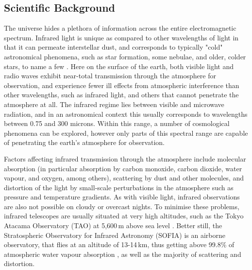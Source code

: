 \subsection{Scientific Background}

The universe hides a plethora of information across the entire electromagnetic spectrum. Infrared light is unique as compared to other wavelengths of light in that it can permeate interstellar dust, and corresponds to typically "cold" astronomical phenomena, such as star formation, some nebulae, and older, colder stars, to name a few \cite{AstroToday}. Here on the surface of the earth, both visible light and radio waves exhibit near-total transmission through the atmosphere for observation, and experience fewer ill effects from atmospheric interference than other wavelengths, such as infrared light, and others that cannot penetrate the atmosphere at all. The infrared regime lies between visible and microwave radiation, and in an astronomical context this usually corresponds to wavelengths between 0.75 and 300 microns. Within this range, a number of cosmological phenomena can be explored, however only parts of this spectral range are capable of penetrating the earth's atmosphere for observation.

Factors affecting infrared transmission through the atmosphere include molecular absorption (in particular absorption by carbon monoxide, carbon dioxide, water vapour, and oxygen, among others), scattering by dust and other molecules, and distortion of the light by small-scale perturbations in the atmosphere such as pressure and temperature gradients. As with visible light, infrared observations are also not possible on cloudy or overcast nights. To minimise these problems, infrared telescopes are usually situated at very high altitudes, such as the Tokyo Atacama Observatory (TAO) at 5,600\,m above sea level \cite{TAO}. Better still, the Stratospheric Observatory for Infrared Astronomy (SOFIA) is an airborne observatory, that flies at an altitude of 13-14\,km, thus getting above 99.8\% of atmospheric water vapour absorption \cite{SOFIA}, as well as the majority of scattering and distortion. 
